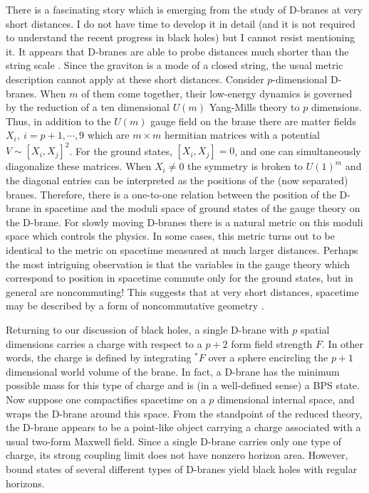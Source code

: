 There is a fascinating story which is emerging from the study
of D-branes at very short distances. I do not have time to develop it
in detail (and it is not required to understand the recent progress
in black holes) but I cannot resist mentioning it. It appears that
D-branes are able to probe distances much shorter than the string
scale \cite{dkps}. Since the graviton is a mode of a closed
string, the usual metric
description cannot apply at these short distances. Consider
$p$-dimensional D-branes.  When $m$ of them come together, their
low-energy dynamics is governed by the reduction of a ten dimensional
$U(m)$ Yang-Mills theory to $p$ dimensions.
Thus, in addition to the $U(m)$ gauge field on the brane there
are matter fields $X_i, \ i=p+1,\cdots, 9$ which are $m\times m$ hermitian
matrices with a potential $V\sim [X_i, X_j]^2$. For the ground states,
$[X_i, X_j]=0$, and one can simultaneously diagonalize these matrices.  When
$X_i\not= 0$ the symmetry is broken to $U(1)^m$ and the diagonal entries
can be interpreted as the positions of the (now separated) branes.
 Therefore,
there is a one-to-one relation between the position of
the D-brane in spacetime and the moduli space of
ground states of the gauge theory on
the D-brane. For slowly moving D-branes there is a natural metric on
this moduli space which controls the physics. In some cases, this
metric turns out to be
identical to the metric on spacetime measured at much larger
distances. Perhaps the most intriguing observation is that
the variables
in the gauge theory which  correspond to position in spacetime 
commute only for the ground states, but in general are noncommuting! This
suggests that at very short distances, spacetime may be described
by a form of noncommutative geometry \cite{con}.


Returning to our discussion of black holes,
a single D-brane with $p$ spatial dimensions 
carries a charge with respect to a $p+2$ form field strength $F$.
In other words, the charge is defined by integrating ${}^*F$ over a sphere
encircling the $p+1$ dimensional world volume of the brane.
In fact, a D-brane has the minimum possible mass for this type of charge
and is (in a well-defined sense) a BPS state.
Now suppose one compactifies spacetime on a $p$ dimensional internal space, and
wraps the D-brane around this space. From the standpoint of the reduced
theory, the D-brane appears to be a point-like object carrying a charge
associated with a usual two-form Maxwell field. Since a single D-brane
carries only one type of charge,  its strong coupling limit does not
have nonzero horizon area. However, bound states of several different
types of D-branes
yield black holes with regular horizons.

